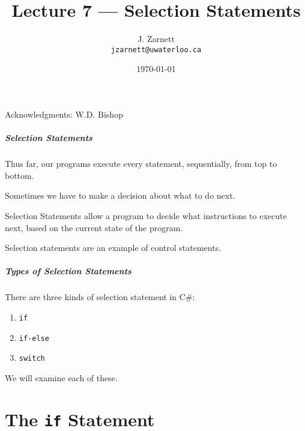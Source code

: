 

\title{Lecture 7 --- Selection Statements}

\author{J. Zarnett\\
\texttt{jzarnett@uwaterloo.ca}}
\date{\today}



\begin{frame}
  \titlepage
  
  \begin{center}
  \small{Acknowledgments: W.D. Bishop}
  \end{center}
 \end{frame}
 
\begin{frame}
\frametitle{Selection Statements}
Thus far, our programs execute every statement, sequentially, from top to bottom.

Sometimes we have to make a decision about what to do next.

\alert{Selection Statements} allow a program to decide what instructions to execute next, based on the current state of the program.

Selection statements are an example of \alert{control statements}.

\end{frame}

\begin{frame}
\frametitle{Types of Selection Statements}

There are three kinds of selection statement in C\#:

\begin{enumerate}
	\item \texttt{if}
	\item \texttt{if-else}
	\item \texttt{switch}
\end{enumerate}

We will examine each of these.

\end{frame}

\part{The \texttt{if} Statement}
\begin{frame}\partpage\end{frame}

